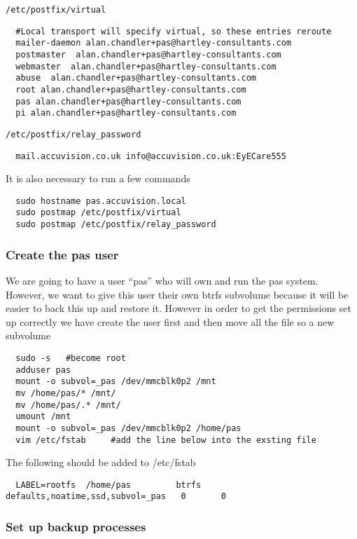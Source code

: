 \documentclass[Draft]{akc}
\begin{document}
\texttt{/etc/postfix/virtual}

\begin{lstlisting}
  #Local transport will specify virtual, so these entries reroute
  mailer-daemon alan.chandler+pas@hartley-consultants.com
  postmaster  alan.chandler+pas@hartley-consultants.com
  webmaster  alan.chandler+pas@hartley-consultants.com
  abuse  alan.chandler+pas@hartley-consultants.com
  root alan.chandler+pas@hartley-consultants.com
  pas alan.chandler+pas@hartley-consultants.com
  pi alan.chandler+pas@hartley-consultants.com

\end{lstlisting}

\texttt{/etc/postfix/relay\_password}

\begin{lstlisting}
  mail.accuvision.co.uk info@accuvision.co.uk:EyECare555
\end{lstlisting}

It is also necessary to run a few commands
\begin{lstlisting}
  sudo hostname pas.accuvision.local
  sudo postmap /etc/postfix/virtual
  sudo postmap /etc/postfix/relay_password
\end{lstlisting}

\subsubsection{Create the pas user}

We are going to have a user ``pas'' who will own and run the pas system.  However, we want to give this
user their own btrfs subvolume because it will be easier to back this up and restore it.  However in order to get the permissions
set up correctly we have create the user first and then move all the file so a new subvolume
\begin{lstlisting}
  sudo -s   #become root
  adduser pas
  mount -o subvol=_pas /dev/mmcblk0p2 /mnt
  mv /home/pas/* /mnt/
  mv /home/pas/.* /mnt/
  umount /mnt
  mount -o subvol=_pas /dev/mmcblk0p2 /home/pas
  vim /etc/fstab     #add the line below into the exsting file
\end{lstlisting}

The following should be added to /etc/fstab
\begin{lstlisting}
  LABEL=rootfs  /home/pas	      btrfs   defaults,noatime,ssd,subvol=_pas   0       0
\end{lstlisting}

\subsubsection{Set up backup processes}
\end{document}
